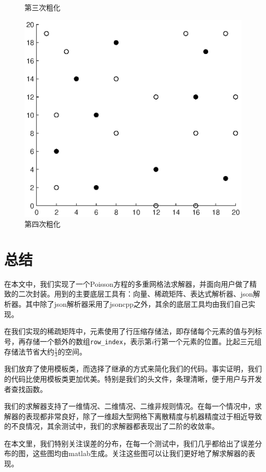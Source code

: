 \documentclass[lang=cn,10pt]{elegantbook}
\begin{document}
\begin{figure}[H]
\begin{minipage}[t]{0.45\linewidth}
    \caption*{\small 第三次粗化}
  \end{minipage}
  \begin{minipage}[t]{0.45\linewidth}
    \centering
    \includegraphics[width=0.7\linewidth]{figure/4-3-4.eps}
    \caption*{\small 第四次粗化}
  \end{minipage}
\end{figure}

\newpage

\chapter{总结}

在本文中，我们实现了一个Poisson方程的多重网格法求解器，并面向用户做了精致的二次封装。用到的主要底层工具有：向量、稀疏矩阵、表达式解析器、json解析器。其中除了json解析器采用了jsoncpp之外，其余的底层工具均由我们自己实现。

在我们实现的稀疏矩阵中，元素使用了行压缩存储法，即存储每个元素的值与列标号，再存储一个额外的数组\verb|row_index|，表示第$i$行第一个元素的位置。比起三元组存储法节省大约$\frac{1}{3}$的空间。

我们放弃了使用模板类，而选择了继承的方式来简化我们的代码。事实证明，我们的代码比使用模板类更加优美。特别是我们的头文件，条理清晰，便于用户与开发者查找函数。

我们的求解器支持了一维情况、二维情况、二维非规则情况。在每一个情况中，求解器的表现都非常良好，除了一维超大型网格下离散精度与机器精度过于相近导致的不良情况，其余测试中，我们的求解器都表现出了二阶的收敛率。

在本文里，我们特别关注误差的分布，在每一个测试中，我们几乎都给出了误差分布的图，这些图均由matlab生成。关注这些图可以让我们更好地了解求解器的表现。
\end{document}
